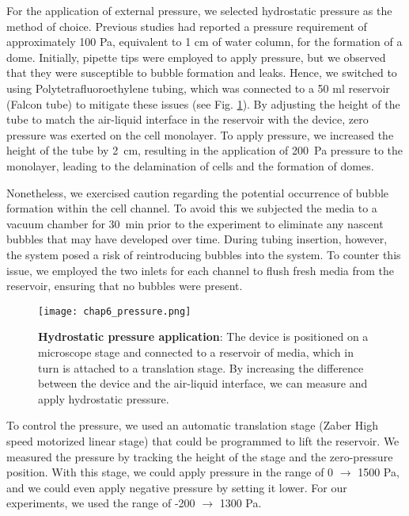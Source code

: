 For the application of external pressure, we selected hydrostatic pressure as the method of choice. Previous studies had reported a pressure requirement of approximately 100 \unit{\pascal}, equivalent to 1 \unit{\cm} of water column, for the formation of a dome. Initially, pipette tips were employed to apply pressure, but we observed that they were susceptible to bubble formation and leaks. Hence, we switched to using Polytetrafluoroethylene tubing, which was connected to a 50 \unit{\ml} reservoir (Falcon tube) to mitigate these issues (see Fig. \ref{fig_6_3}). By adjusting the height of the tube to match the air-liquid interface in the reservoir with the device, zero pressure was exerted on the cell monolayer. To apply pressure, we increased the height of the tube by 2~\unit{\cm}, resulting in the application of 200~\unit{\pascal} pressure to the monolayer, leading to the delamination of cells and the formation of domes.

Nonetheless, we exercised caution regarding the potential occurrence of bubble formation within the cell channel. To avoid this we subjected the media to a vacuum chamber for 30~\unit{\minute} prior to the experiment to eliminate any nascent bubbles that may have developed over time. During tubing insertion, however, the system posed a risk of reintroducing bubbles into the system. To counter this issue, we employed the two inlets for each channel to flush fresh media from the reservoir, ensuring that no bubbles were present.

\begin{figure}[h!]
	\centering
	\texttt{[image: chap6\_pressure.png]}
	\caption{\textbf{Hydrostatic pressure application}: The device is positioned on a microscope stage and connected to a reservoir of media, which in turn is attached to a translation stage. By increasing the difference between the device and the air-liquid interface, we can measure and apply hydrostatic pressure.	} \label{fig_6_3}
\end{figure}

To control the pressure, we used an automatic translation stage (Zaber High speed motorized linear stage) that could be programmed to lift the reservoir. We measured the pressure by tracking the height of the stage and the zero-pressure position. With this stage, we could apply pressure in the range of 0 $\rightarrow$ 1500 \unit{\pascal}, and we could even apply negative pressure by setting it lower. For our experiments, we used the range of -200 $\rightarrow$ 1300 \unit{\pascal}.

